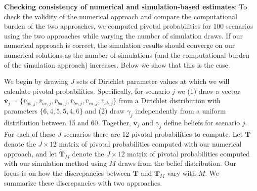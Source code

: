 \documentclass[11pt,a4paper]{article}
\begin{document}




\noindent \textbf{Checking consistency of numerical and simulation-based estimates}:  To check the validity of the numerical approach and compare the computational burden of the two approaches, we computed pivotal probabilities for 100 scenarios using the two approaches while varying the number of simulation draws. If our numerical approach is correct, the simulation results should converge on our numerical solutions as the number of simulations (and the computational burden of the simulation approach) increases. Below we show that this is the case.  

We begin by drawing $J$ sets of Dirichlet parameter values at which we will calculate pivotal probabilities. Specifically, for scenario $j$ we (1) draw a vector $\mathbf{\overline{v}}_j = \{\overline{v}_{ab,j}, \overline{v}_{ac,j}, \overline{v}_{ba,j}, \overline{v}_{bc,j}, \overline{v}_{ca,j}, \overline{v}_{cb,j} \}$  from a Dirichlet distribution with parameters $\{6,4,5,5,4,6\}$ and (2) draw $\gamma_j$ independently from a uniform distribution between 15 and 60. Together, $\mathbf{\overline{v}}_j$ and $\gamma_j$ define beliefs for scenario $j$. 
For each of these $J$ scenarios there are 12 pivotal probabilities to compute. %
Let $\mathbf{T}$ denote the $J \times 12$ matrix of pivotal probabilities computed with our numerical approach, and let $\mathbf{\tilde{T}}_M$ denote the $J \times 12$ matrix of pivotal probabilities computed with our simulation method using $M$ draws from the belief distribution. %
Our focus is on how the discrepancies between $\mathbf{T}$ and $\mathbf{T}_M$ vary with $M$. We summarize these discrepancies with two approaches.
\end{document}
